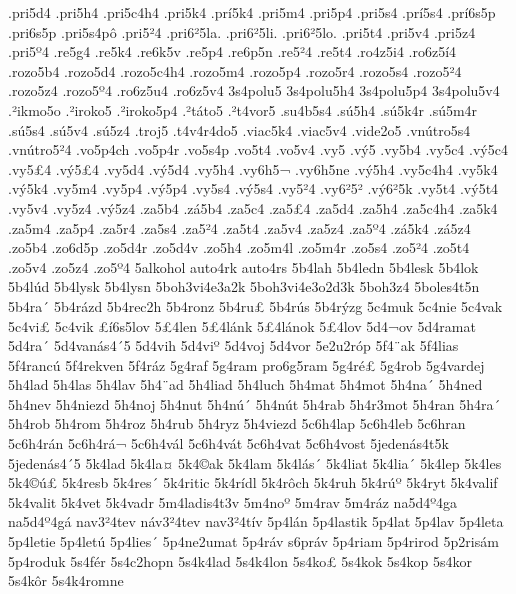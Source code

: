 {.pri5d4
.pri5h4
.pri5c4h4
.pri5k4
.pr^^ed5k4
.pri5m4
.pri5p4
.pri5s4
.pr^^ed5s4
.pr^^ed6s5p
.pri6s5p
.pri5s4p^^f4
.pri5^^b24
.pri6^^b25la.
.pri6^^b25li.
.pri6^^b25lo.
.pri5t4
.pri5v4
.pri5z4
.pri5^^ba4
.re5g4
.re5k4
.re6k5v
.re5p4
.re6p5n
.re5^^b24
.re5t4
.ro4z5i4
.ro6z5^^ed4
.rozo5b4
.rozo5d4
.rozo5c4h4
.rozo5m4
.rozo5p4
.rozo5r4
.rozo5s4
.rozo5^^b24
.rozo5z4
.rozo5^^ba4
.ro6z5u4
.ro6z5v4
3s4polu5
3s4polu5h4
3s4polu5p4
3s4polu5v4
.^^b2ikmo5o
.^^b2iroko5
.^^b2iroko5p4
.^^b2t^^e1to5
.^^b2t4vor5
.su4b5s4
.s^^fa5h4
.s^^fa5k4r
.s^^fa5m4r
.s^^fa5s4
.s^^fa5v4
.s^^fa5z4
.troj5
.t4v4r4do5
.viac5k4
.viac5v4
.vide2o5
.vn^^fatro5s4
.vn^^fatro5^^b24
.vo5p4ch
.vo5p4r
.vo5s4p
.vo5t4
.vo5v4
.vy5
.v^^fd5
.vy5b4
.vy5c4
.v^^fd5c4
.vy5^^a34
.v^^fd5^^a34
.vy5d4
.v^^fd5d4
.vy5h4
.vy6h5^^ac
.vy6h5ne
.v^^fd5h4
.vy5c4h4
.vy5k4
.v^^fd5k4
.vy5m4
.vy5p4
.v^^fd5p4
.vy5s4
.v^^fd5s4
.vy5^^b24
.vy6^^b25^^b2
.v^^fd6^^b25k
.vy5t4
.v^^fd5t4
.vy5v4
.vy5z4
.v^^fd5z4
.za5b4
.z^^e15b4
.za5c4
.za5^^a34
.za5d4
.za5h4
.za5c4h4
.za5k4
.za5m4
.za5p4
.za5r4
.za5s4
.za5^^b24
.za5t4
.za5v4
.za5z4
.za5^^ba4
.z^^e15k4
.z^^e15z4
.zo5b4
.zo6d5p
.zo5d4r
.zo5d4v
.zo5h4
.zo5m4l
.zo5m4r
.zo5s4
.zo5^^b24
.zo5t4
.zo5v4
.zo5z4
.zo5^^ba4
5alkohol
auto4rk
auto4rs
5b4lah
5b4ledn
5b4lesk
5b4lok
5b4l^^fad
5b4lysk
5b4lysn
5boh3vi4e3a2k
5boh3vi4e3o2d3k
5boh3z4
5boles4t5n
5b4ra^^b4
5b4r^^e1zd
5b4rec2h
5b4ronz
5b4ru^^a3
5b4r^^fas
5b4r^^fdzg
5c4muk
5c4nie
5c4vak
5c4vi^^a3
5c4vik
^^a3^^ed6s5lov
5^^a34len
5^^a34l^^e1nk
5^^a34l^^e1nok
5^^a34lov
5d4^^acov
5d4ramat
5d4ra^^b4
5d4van^^e1s4^^b45
5d4vih
5d4vi^^ba
5d4voj
5d4vor
5e2u2r^^f3p
5f4^^a8ak
5f4lias
5f4ranc^^fa
5f4rekven
5f4r^^e1z
5g4raf
5g4ram
pro6g5ram
5g4r^^e9^^a3
5g4rob
5g4vardej
5h4lad
5h4las
5h4lav
5h4^^a8ad
5h4liad
5h4luch
5h4mat
5h4mot
5h4na^^b4
5h4ned
5h4nev
5h4niezd
5h4noj
5h4nut
5h4n^^fa^^b4
5h4n^^fat
5h4rab
5h4r3mot
5h4ran
5h4ra^^b4
5h4rob
5h4rom
5h4roz
5h4rub
5h4ryz
5h4viezd
5c6h4lap
5c6h4leb
5c6hran
5c6h4r^^e1n
5c6h4r^^e1^^ac
5c6h4v^^e1l
5c6h4v^^e1t
5c6h4vat
5c6h4vost
5jeden^^e1s4t5k
5jeden^^e1s4^^b45
5k4lad
5k4la^^a4
5k4^^a9ak
5k4lam
5k4l^^e1s^^b4
5k4liat
5k4lia^^b4
5k4lep
5k4les
5k4^^a9^^fa^^a3
5k4resb
5k4res^^b4
5k4ritic
5k4r^^eddl
5k4r^^f4ch
5k4ruh
5k4r^^fa^^ba
5k4ryt
5k4valif
5k4valit
5k4vet
5k4vadr
5m4ladis4t3v
5m4no^^ba
5m4rav
5m4r^^e1z
na5d4^^ba4ga
na5d4^^ba4g^^e1
nav3^^b24tev
n^^e1v3^^b24tev
nav3^^b24t^^edv
5p4l^^e1n
5p4lastik
5p4lat
5p4lav
5p4leta
5p4letie
5p4let^^fa
5p4lies^^b4
5p4ne2umat
5p4r^^e1v
s6pr^^e1v
5p4riam
5p4rirod
5p2ris^^e1m
5p4roduk
5s4f^^e9r
5s4c2hopn
5s4k4lad
5s4k4lon
5s4ko^^a3
5s4kok
5s4kop
5s4kor
5s4k^^f4r
5s4k4romne
}
